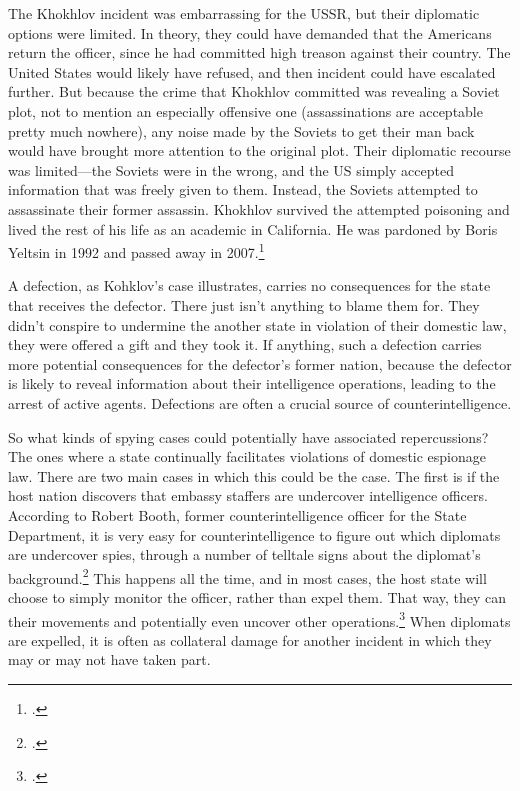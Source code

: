 \documentclass[11pt]{memoir}
\begin{document}
\begin{refsegment}
The Khokhlov incident was embarrassing for the USSR, but their diplomatic options were limited. In theory, they could have demanded that the Americans return the officer, since he had committed high treason against their country. The United States would likely have refused, and then incident could have escalated further. But because the crime that Khokhlov committed was revealing a Soviet plot, not to mention an especially offensive one (assassinations are acceptable pretty much nowhere), any noise made by the Soviets to get their man back would have brought more attention to the original plot. Their diplomatic recourse was limited---the Soviets were in the wrong, and the US simply accepted information that was freely given to them. Instead, the Soviets attempted to assassinate their former assassin. Khokhlov survived the attempted poisoning and lived the rest of his life as an academic in California. He was pardoned by Boris Yeltsin in 1992 and passed away in 2007.\footcite[p.~57]{mickolus_counterintelligence_2015}

A defection, as Kohklov's case illustrates, carries no consequences for the state that receives the defector. There just isn't anything to blame them for. They didn't conspire to undermine the another state in violation of their domestic law, they were offered a gift and they took it. If anything, such a defection carries more potential consequences for the defector's former nation, because the defector is likely to reveal information about their intelligence operations, leading to the arrest of active agents. Defections are often a crucial source of counterintelligence.

So what kinds of spying cases could potentially have associated repercussions? The ones where a state continually facilitates violations of domestic espionage law. There are two main cases in which this could be the case. The first is if the host nation discovers that embassy staffers are undercover intelligence officers. According to Robert Booth, former counterintelligence officer for the State Department, it is very easy for counterintelligence to figure out which diplomats are undercover spies, through a number of telltale signs about the diplomat's background.\footcite{booth_personal_2019} This happens all the time, and in most cases, the host state will choose to simply monitor the officer, rather than expel them. That way, they can their movements and potentially even uncover other operations.\footcite{booth_personal_2019} When diplomats are expelled, it is often as collateral damage for another incident in which they may or may not have taken part.


\end{refsegment}
\end{document}
